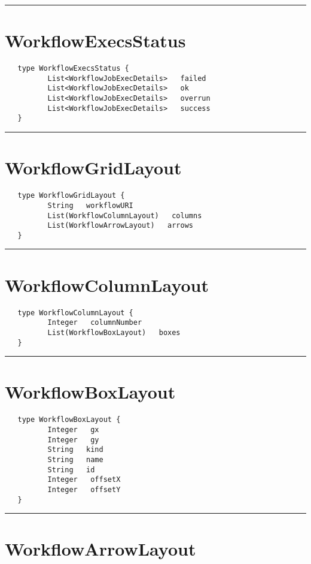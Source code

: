 \rule{12cm}{2pt}
\section{WorkflowExecsStatus}
\label{type:WorkflowExecsStatus}

\begin{verbatim}
   type WorkflowExecsStatus {
          List<WorkflowJobExecDetails>   failed
          List<WorkflowJobExecDetails>   ok
          List<WorkflowJobExecDetails>   overrun
          List<WorkflowJobExecDetails>   success
   }
\end{verbatim}

\rule{12cm}{2pt}
\section{WorkflowGridLayout}
\label{type:WorkflowGridLayout}

\begin{verbatim}
   type WorkflowGridLayout {
          String   workflowURI
          List(WorkflowColumnLayout)   columns
          List(WorkflowArrowLayout)   arrows
   }
\end{verbatim}

\rule{12cm}{2pt}
\section{WorkflowColumnLayout}
\label{type:WorkflowColumnLayout}

\begin{verbatim}
   type WorkflowColumnLayout {
          Integer   columnNumber
          List(WorkflowBoxLayout)   boxes
   }
\end{verbatim}

\rule{12cm}{2pt}
\section{WorkflowBoxLayout}
\label{type:WorkflowBoxLayout}

\begin{verbatim}
   type WorkflowBoxLayout {
          Integer   gx
          Integer   gy
          String   kind
          String   name
          String   id
          Integer   offsetX
          Integer   offsetY
   }
\end{verbatim}

\rule{12cm}{2pt}
\section{WorkflowArrowLayout}
\label{type:WorkflowArrowLayout}

